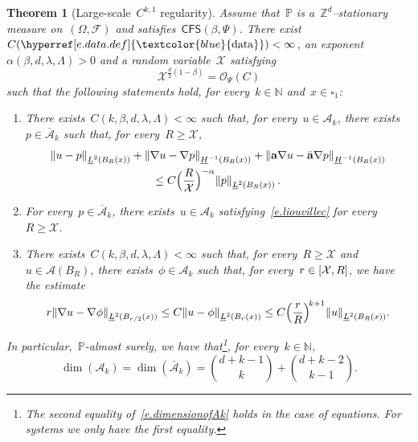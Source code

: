 \documentclass[11pt,twoside]{article} %
\let\oldsquare\square %
\renewcommand{\square}{\oldsquare}
\numberwithin{equation}{section}
\newtheorem{theorem}{Theorem}[section]
\theoremstyle{definition}
\newcommand{\dataref}{\hyperref[e.data.def]{\textcolor{blue}{\ensuremath{\mathrm{data}}}}}
\let\originalleft\left
\let\originalright\right
\renewcommand{\left}{\mathopen{}\mathclose\bgroup\originalleft}
\renewcommand{\right}{\aftergroup\egroup\originalright}
\newcommand*{\N}{\ensuremath{\mathbb{N}}}
\newcommand*{\Zd}{\ensuremath{\mathbb{Z}^d}}
\newcommand*{\Rd}{\ensuremath{\mathbb{R}^d}}
\renewcommand{\a}{\mathbf{a}}
\newcommand{\ahom}{\bar{\a}}
\newcommand{\cu}{\square}
\newcommand{\F}{\mathcal{F}}
\renewcommand{\P}{\mathbb{P}}
\newcommand{\X}{\mathcal{X}}
\renewcommand{\O}{\mathcal{O}}
\newcommand{\CFS}{\mathsf{CFS}}
\newcommand{\A}{\mathcal{A}}
\newcommand{\Ahom}{\bar{\A}}
\begin{document}
\begin{theorem}[{Large-scale~$C^{k,1}$ regularity}]
\label{t.Ck1}
Assume that~$\P$ is a~$\Zd$--stationary measure on~$(\Omega,\F)$ and satisfies~$\CFS(\beta,\Psi)$. 
There exist~$C(\dataref)<\infty$, an exponent~$\alpha(\beta,d,\lambda,\Lambda)>0$ and a random variable~$\X$ satisfying
\begin{equation}
\label{e.X}
\X^{\frac d2(1-\beta)  } 
= 
\O_{\Psi}(C) 
\end{equation}
such that the following statements hold, for every~$k\in\N$ and~$x \in \cu_1$:
\begin{enumerate}
\item[{$\mathrm{(i)}_k$}] There exists~$C(k,\beta,d,\lambda,\Lambda)<\infty$ such that, for every~$u \in \A_k$, there exists~$p\in \overline{\A}_k$ such that, for every~$R\geq \X$,
\begin{multline} \label{e.liouvillec}
\left\| u - p \right\|_{\underline{L}^2(B_R(x))} 
+
\left\|  \nabla u - \nabla p \right\|_{\underline{H}^{-1}(B_R(x))} 
+
\left\|  \a \nabla u - \ahom \nabla p \right\|_{\underline{H}^{-1}(B_R(x))} 
\\ 
\leq 
C \Bigl( \frac{R}{\X} \Bigr)^{-\alpha}
\left\| p \right\|_{\underline{L}^2(B_R(x))}
\,.
\end{multline}

\item[{$\mathrm{(ii)}_k$}]For every~$p\in \overline{\A}_k$, there exists~$u\in \A_k$ satisfying~\eqref{e.liouvillec} for every~$R\geq \X$. 

\item[{$\mathrm{(iii)}_k$}]
There exists~$C(k,\beta,d,\lambda,\Lambda)<\infty$ such that, for every~$R\geq \X$ and~$u\in \A(B_R)$, there exists~$\phi \in \A_k$ such that, for every~$r \in \left[ \X,  R \right]$, we have the estimate
\begin{equation}
\label{e.intrinsicreg}
r \left\| \nabla u - \nabla \phi \right\|_{\underline{L}^2(B_{r/2}(x))}
\leq 
C \left\| u - \phi \right\|_{\underline{L}^2(B_r(x))} 
\leq 
C \Bigl( \frac r R \Bigr)^{\!k+1} %
\left\| u \right\|_{\underline{L}^2(B_R(x))}.
\end{equation}
\end{enumerate}
In particular,~$\P$-almost surely, we have that\footnote{The second equality of~\eqref{e.dimensionofAk} holds in the case of equations. For systems we only have the first equality.}, for every~$k\in\N$,
\begin{equation} 
\label{e.dimensionofAk}
\dim(\A_k) = \dim(\Ahom_k) =  \binom{d+k-1}{k} + \binom{d+k-2}{k-1}.
\end{equation}
\end{theorem}
\end{document}
